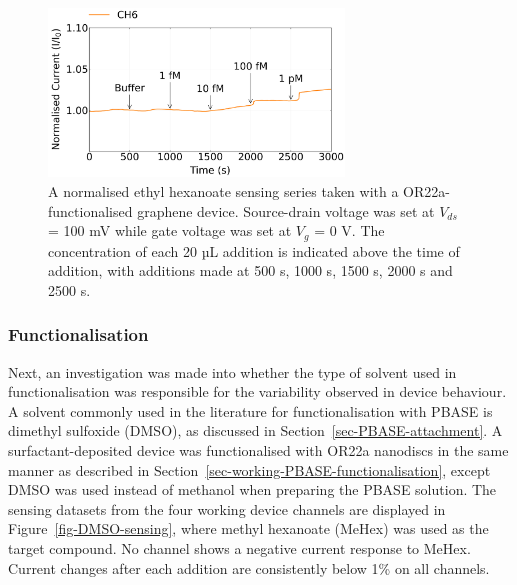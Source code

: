 \documentclass[
  a4paper,
]{scrbook}
\begin{document}
\begin{figure}

{\centering \includegraphics[width=0.7\textwidth,height=\textheight]{figures/ch7/Q3C3_filtered_detrend_trunc_arrows_normalised_edit.png}

}

\caption[A normalised ethyl hexanoate sensing series taken with a
OR22a-functionalised graphene device.]{\label{fig-graphene-sensing}A
normalised ethyl hexanoate sensing series taken with a
OR22a-functionalised graphene device. Source-drain voltage was set at
\(V_{ds}\) = 100 mV while gate voltage was set at \(V_g\) = 0 V. The
concentration of each 20 µL addition is indicated above the time of
addition, with additions made at 500 s, 1000 s, 1500 s, 2000 s and 2500
s.}

\end{figure}

\hypertarget{functionalisation}{%
\subsubsection*{Functionalisation}\label{functionalisation}}

Next, an investigation was made into whether the type of solvent used in
functionalisation was responsible for the variability observed in device
behaviour. A solvent commonly used in the literature for
functionalisation with PBASE is dimethyl sulfoxide (DMSO), as discussed
in Section~\ref{sec-PBASE-attachment}. A surfactant-deposited device was
functionalised with OR22a nanodiscs in the same manner as described in
Section~\ref{sec-working-PBASE-functionalisation}, except DMSO was used
instead of methanol when preparing the PBASE solution. The sensing
datasets from the four working device channels are displayed in
Figure~\ref{fig-DMSO-sensing}, where methyl hexanoate (MeHex) was used
as the target compound. No channel shows a negative current response to
MeHex. Current changes after each addition are consistently below 1\% on
all channels.
\end{document}
